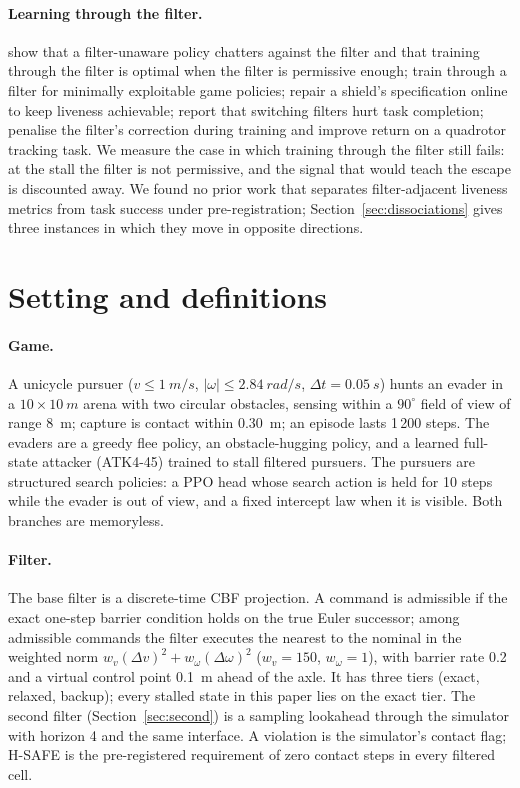 \documentclass{l4dc2027}
\begin{document}
\paragraph{Learning through the filter.} \citet{oh2026provably} show that a filter-unaware policy chatters against the filter and that training through the filter is optimal when the filter is permissive enough; \citet{wu2026competence} train through a filter for minimally exploitable game policies; \citet{georgescu2026gr1} repair a shield's specification online to keep liveness achievable; \citet{nakamura2025latent} report that switching filters hurt task completion; \citet{pizarro2025filtering} penalise the filter's correction during training and improve return on a quadrotor tracking task. We measure the case in which training through the filter still fails: at the stall the filter is not permissive, and the signal that would teach the escape is discounted away. We found no prior work that separates filter-adjacent liveness metrics from task success under pre-registration; Section~\ref{sec:dissociations} gives three instances in which they move in opposite directions.

\section{Setting and definitions}\label{sec:setting}

\paragraph{Game.} A unicycle pursuer ($v \le \SI{1}{m/s}$, $|\omega| \le \SI{2.84}{rad/s}$, $\Delta t = \SI{0.05}{s}$) hunts an evader in a $10 \times \SI{10}{m}$ arena with two circular obstacles, sensing within a $90^\circ$ field of view of range \SI{8}{m}; capture is contact within \SI{0.30}{m}; an episode lasts 1\,200 steps. The evaders are a greedy flee policy, an obstacle-hugging policy, and a learned full-state attacker (ATK4-45) trained to stall filtered pursuers. The pursuers are structured search policies: a PPO head whose search action is held for 10 steps while the evader is out of view, and a fixed intercept law when it is visible. Both branches are memoryless.

\paragraph{Filter.} The base filter is a discrete-time CBF projection. A command is admissible if the exact one-step barrier condition holds on the true Euler successor; among admissible commands the filter executes the nearest to the nominal in the weighted norm $w_v(\Delta v)^2 + w_\omega(\Delta\omega)^2$ ($w_v = 150$, $w_\omega = 1$), with barrier rate 0.2 and a virtual control point \SI{0.1}{m} ahead of the axle. It has three tiers (exact, relaxed, backup); every stalled state in this paper lies on the exact tier. The second filter (Section~\ref{sec:second}) is a sampling lookahead through the simulator with horizon 4 and the same interface. A violation is the simulator's contact flag; H-SAFE is the pre-registered requirement of zero contact steps in every filtered cell.
\end{document}
